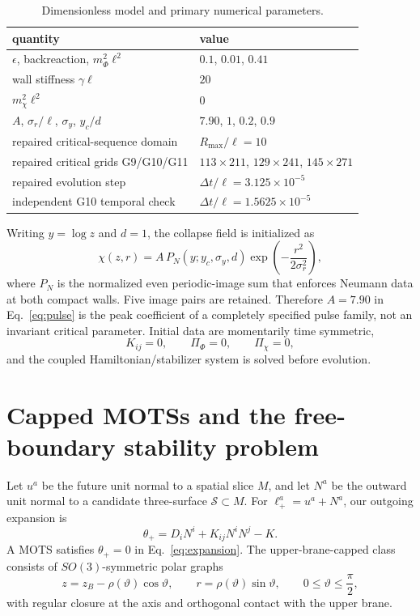 \documentclass[11pt]{article}
\begin{document}
\begin{table}[t]
\centering
\caption{Dimensionless model and primary numerical parameters.}
\label{tab:model}
\begin{tabular}{@{}ll@{}}
\toprule
quantity & value \\
\midrule
$\epsilon$, backreaction, $m_\Phi^2\ell^2$ & $0.1$, $0.01$, $0.41$ \\
wall stiffness $\gamma\ell$ & $20$ \\
$m_\chi^2\ell^2$ & $0$ \\
$A$, $\sigma_r/\ell$, $\sigma_y$, $y_c/d$ & $7.90$, $1$, $0.2$, $0.9$ \\
repaired critical-sequence domain & $R_{\max}/\ell=10$ \\
repaired critical grids G9/G10/G11 & $113\times211$, $129\times241$, $145\times271$ \\
repaired evolution step & $\Delta t/\ell=3.125\times10^{-5}$ \\
independent G10 temporal check & $\Delta t/\ell=1.5625\times10^{-5}$ \\
\bottomrule
\end{tabular}
\end{table}

Writing $y=\log z$ and $d=1$, the collapse field is initialized as
\begin{equation}
\chi(z,r)=A\,P_N(y;y_c,\sigma_y,d)
 \exp\!\left(-\frac{r^2}{2\sigma_r^2}\right),
\label{eq:pulse}
\end{equation}
where $P_N$ is the normalized even periodic-image sum that enforces Neumann
data at both compact walls.  Five image pairs are retained.  Therefore
$A=7.90$ in Eq.~\eqref{eq:pulse} is the peak coefficient of a completely
specified pulse family, not
an invariant critical parameter.  Initial data are momentarily time
symmetric,
\begin{equation}
K_{ij}=0,\qquad \Pi_\Phi=0,\qquad \Pi_\chi=0,
\end{equation}
and the coupled Hamiltonian/stabilizer system is solved before evolution.

\section{Capped MOTSs and the free-boundary stability problem}

Let $u^a$ be the future unit normal to a spatial slice $M$, and let $N^a$ be
the outward unit normal to a candidate three-surface $\mathcal S\subset M$.
For $\ell_+^a=u^a+N^a$, our outgoing expansion is
\begin{equation}
\theta_+=D_iN^i+K_{ij}N^iN^j-K.
\label{eq:expansion}
\end{equation}
A MOTS satisfies $\theta_+=0$ in Eq.~\eqref{eq:expansion}.  The upper-brane-capped
class consists of
$SO(3)$-symmetric polar graphs
\begin{equation}
z=z_B-\rho(\vartheta)\cos\vartheta,
\qquad
r=\rho(\vartheta)\sin\vartheta,
\qquad 0\leq\vartheta\leq\frac{\pi}{2},
\label{eq:polargraph}
\end{equation}
with regular closure at the axis and orthogonal contact with the upper brane.
\end{document}
